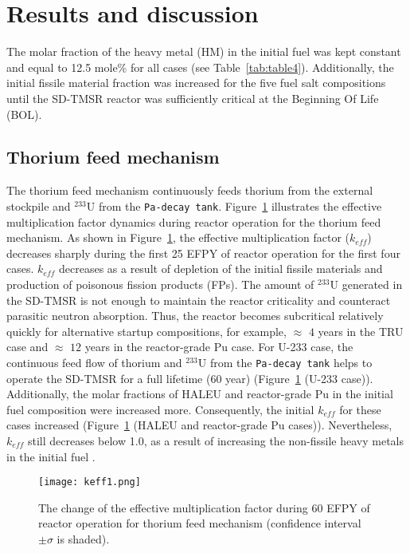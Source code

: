 \section{Results and discussion} \label{Results-and-discussion}
The molar fraction of the heavy metal (HM) 
in the initial fuel was kept constant and equal to 12.5 mole\% for all cases (see Table~\ref{tab:table4}). 
Additionally, the initial fissile material fraction was increased for the five fuel 
salt compositions until the \gls{SD-TMSR} reactor was sufficiently critical at 
the Beginning Of Life (BOL).
\subsection{Thorium feed mechanism}
The thorium feed mechanism continuously feeds thorium from the external stockpile and 
$^{233}$U from the \texttt{Pa-decay tank}.
Figure~\ref{fig:keff1} illustrates the effective multiplication factor 
dynamics during reactor operation for the thorium feed mechanism. As shown in 
Figure~\ref{fig:keff1}, the effective multiplication factor ($k_{eff}$) 
decreases sharply during the first 25 \gls{EFPY} of reactor operation for the first 
four cases. $k_{eff}$ decreases as a result of depletion of the initial 
fissile materials and production of poisonous fission products (FPs). The amount of $^{233}$U generated in 
the SD-TMSR is not enough to maintain the reactor criticality and 
counteract parasitic neutron absorption. Thus, the 
reactor becomes subcritical relatively quickly for alternative startup 
compositions, for example, $\approx$ $4$ years in the \gls{TRU} case and $\approx$ $12$ 
years in the reactor-grade Pu case. For U-233 case, 
the continuous feed flow of thorium and $^{233}$U from the \texttt{Pa-decay tank} helps to operate the 
\gls{SD-TMSR} for a full lifetime (60 year) (Figure~\ref{fig:keff1} (U-233 case)). 
Additionally, the molar fractions of \gls{HALEU} and reactor-grade Pu in the initial fuel composition were increased
more. Consequently, the initial $k_{eff}$ for these cases increased (Figure~\ref{fig:keff1} (HALEU and reactor-grade Pu cases)). Nevertheless, $k_{eff}$ still decreases below 1.0, as a result of increasing the non-fissile heavy metals in the initial fuel \cite{betzler2016modeling}.

\begin{figure}
	\centering
	\texttt{[image: keff1.png]}
		\vspace{-0.5in}
	\caption{The change of the effective multiplication factor during 60 \gls{EFPY} of reactor operation for thorium feed mechanism (confidence interval $\pm\sigma$ is shaded).} 
	\label{fig:keff1}
\end{figure}

